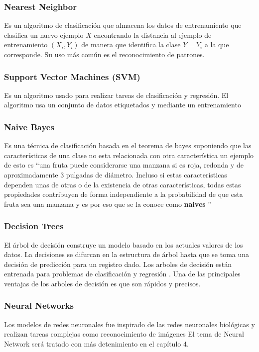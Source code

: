 \subsubsection*{Nearest Neighbor}
Es un algoritmo de clasificación que almacena los datos de entrenamiento que clasifica un nuevo ejemplo $X$ encontrando la distancia al ejemplo de entrenamiento $(X_{i},Y_{i})$ de manera que identifica la clase $Y=Y_{i}$ a la que corresponde. Su uso más común es el reconocimiento de patrones.
\subsubsection*{Support Vector Machines (SVM)}
Es un algoritmo usado para realizar tareas de clasificación y regresión. El algoritmo usa un conjunto de datos etiquetados y mediante un entrenamiento
\subsubsection*{Naive Bayes}
Es una técnica de clasificación basada en el teorema de bayes suponiendo que las características de una clase no esta relacionada con otra característica un ejemplo de esto es \textquotedblleft una fruta puede considerarse una manzana si es roja, redonda y de aproximadamente 3 pulgadas de diámetro. Incluso si estas características dependen unas de otras o de la existencia de otras características, todas estas propiedades contribuyen de forma independiente a la probabilidad de que esta fruta sea una manzana y es por eso que se la conoce como \textbf{naives}  \textquotedblright \cite{WEBSITE:4}
\subsubsection*{Decision Trees}
El árbol de decisión construye un modelo basado en los actuales valores de los datos. La decisiones se difurcan en la estructura de árbol hasta que se toma una decisión de predicción para un registro dado. Los arboles de decisión están entrenada para problemas de clasificación y regresión . Una de las principales ventajas de los arboles de decisión es que son rápidos y precisos.
\subsubsection*{Neural Networks}
Los modelos de redes neuronales fue inspirado de las redes neuronales biológicas y realizan tareas complejas como reconocimiento de imágenes
El tema de Neural Network será tratado con más detenimiento en el capítulo 4.
